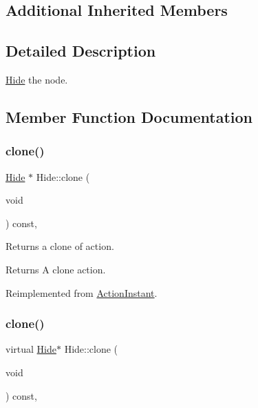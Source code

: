 \subsection*{Additional Inherited Members}


\subsection{Detailed Description}
\hyperlink{classHide}{Hide} the node. 

\subsection{Member Function Documentation}
\mbox{\label{classHide_a93ed7a1853923c544ac4e1039e65e8a8}} 
\subsubsection{\texorpdfstring{clone()}{clone()}\hspace{0.1cm}{\footnotesize\ttfamily [1/2]}}
{\footnotesize\ttfamily \hyperlink{classHide}{Hide} $\ast$ Hide\+::clone (\begin{DoxyParamCaption}\item[{void}]{ }\end{DoxyParamCaption}) const\hspace{0.3cm}{\ttfamily [override]}, {\ttfamily [virtual]}}

Returns a clone of action.

\begin{DoxyReturn}{Returns}
A clone action. 
\end{DoxyReturn}


Reimplemented from \hyperlink{classActionInstant_adb76fc6f006098109e8256210cbd8cc0}{Action\+Instant}.

\mbox{\label{classHide_a5f8450e43c0f2997490fc745a47c6c3f}} 
\subsubsection{\texorpdfstring{clone()}{clone()}\hspace{0.1cm}{\footnotesize\ttfamily [2/2]}}
{\footnotesize\ttfamily virtual \hyperlink{classHide}{Hide}$\ast$ Hide\+::clone (\begin{DoxyParamCaption}\item[{void}]{ }\end{DoxyParamCaption}) const\hspace{0.3cm}{\ttfamily [override]}, {\ttfamily [virtual]}}

